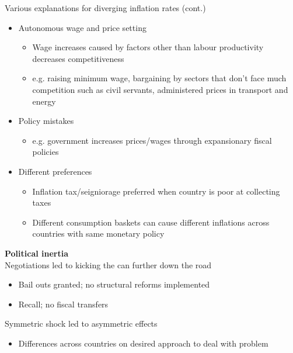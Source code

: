 \documentclass{beamer}
\begin{document}
\begin{frame}
  Various explanations for diverging inflation rates (cont.)
\begin{itemize}  
  \item Autonomous wage and price setting
  \begin{itemize}
    \item Wage increases caused by factors other than labour productivity decreases competitiveness
    \item e.g. raising minimum wage, bargaining by sectors that don't face much competition such as civil servants, administered prices in transport and energy
  \end{itemize}
  \item Policy mistakes
  \begin{itemize}
    \item e.g. government increases prices/wages through expansionary fiscal policies
  \end{itemize}  
  \item Different preferences
  \begin{itemize}
    \item Inflation tax/seigniorage preferred when country is poor at collecting taxes
    \item Different consumption baskets can cause different inflations across countries with same monetary policy
  \end{itemize}
\end{itemize}
\end{frame}

\begin{frame}
  \textbf{Political inertia}\\
  Negotiations led to kicking the can further down the road
  \begin{itemize}
    \item Bail outs granted; no structural reforms implemented
    \item Recall; no fiscal transfers
  \end{itemize}
  \medskip
  Symmetric shock led to asymmetric effects
  \begin{itemize}
    \item Differences across countries on desired approach to deal with problem
  \end{itemize}
\end{frame}
\end{document}
